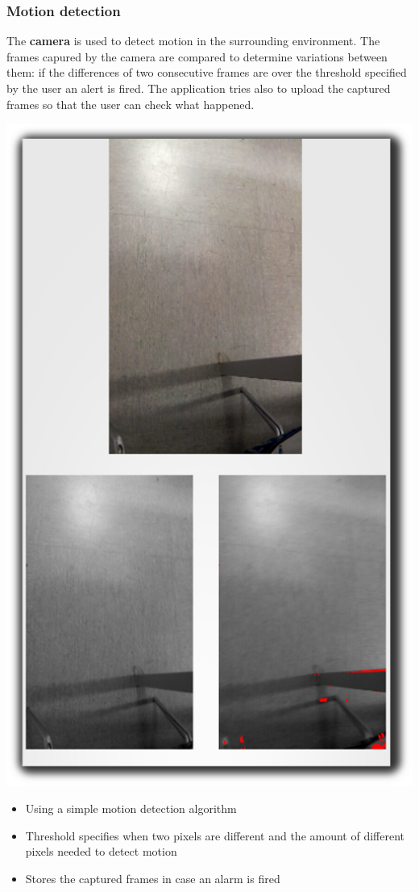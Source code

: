 \documentclass{beamer}
\begin{document}
\begin{frame}
\frametitle{Motion detection}
\begin{block}{}
The \textbf{camera} is used to detect motion in the surrounding environment. The frames capured by the camera are compared to determine variations between them: if the differences of two consecutive frames are over the threshold specified by the user an alert is fired. The application tries also to upload the captured frames so that the user can check what happened.
\end{block}
\begin{minipage}[c]{.25\textwidth}
\includegraphics[scale=.15]{./../ipermediali/img/camera.png}
\end{minipage}\begin{minipage}[c]{.65\textwidth}
\begin{itemize}
  \item Using a simple motion detection algorithm
  \item Threshold specifies when two pixels are different and the amount of different pixels needed to detect motion
  \item Stores the captured frames in case an alarm is fired
\end{itemize}
\end{minipage}
\end{frame}
\end{document}
